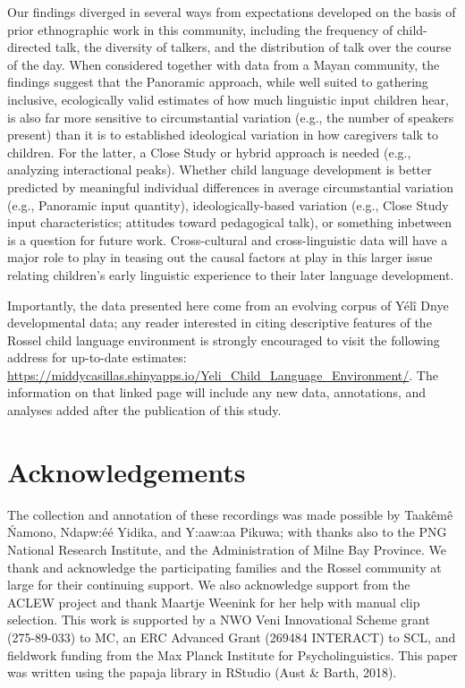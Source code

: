 \documentclass[,man,floatsintext]{apa6}
\begin{document}
Our findings diverged in several ways from expectations developed on the
basis of prior ethnographic work in this community, including the
frequency of child-directed talk, the diversity of talkers, and the
distribution of talk over the course of the day. When considered
together with data from a Mayan community, the findings suggest that the
Panoramic approach, while well suited to gathering inclusive,
ecologically valid estimates of how much linguistic input children hear,
is also far more sensitive to circumstantial variation (e.g., the number
of speakers present) than it is to established ideological variation in
how caregivers talk to children. For the latter, a Close Study or hybrid
approach is needed (e.g., analyzing interactional peaks). Whether child
language development is better predicted by meaningful individual
differences in average circumstantial variation (e.g., Panoramic input
quantity), ideologically-based variation (e.g., Close Study input
characteristics; attitudes toward pedagogical talk), or something
inbetween is a question for future work. Cross-cultural and
cross-linguistic data will have a major role to play in teasing out the
causal factors at play in this larger issue relating children's early
linguistic experience to their later language development.

Importantly, the data presented here come from an evolving corpus of
Yélî Dnye developmental data; any reader interested in citing
descriptive features of the Rossel child language environment is
strongly encouraged to visit the following address for up-to-date
estimates:
\url{https://middycasillas.shinyapps.io/Yeli_Child_Language_Environment/}.
The information on that linked page will include any new data,
annotations, and analyses added after the publication of this study.

\section{Acknowledgements}\label{acknowledgements}

The collection and annotation of these recordings was made possible by
Taakêmê Ńamono, Ndapw:éé Yidika, and Y:aaw:aa Pikuwa; with thanks also
to the PNG National Research Institute, and the Administration of Milne
Bay Province. We thank and acknowledge the participating families and
the Rossel community at large for their continuing support. We also
acknowledge support from the ACLEW project and thank Maartje Weenink for
her help with manual clip selection. This work is supported by a NWO
Veni Innovational Scheme grant (275-89-033) to MC, an ERC Advanced Grant
(269484 INTERACT) to SCL, and fieldwork funding from the Max Planck
Institute for Psycholinguistics. This paper was written using the papaja
library in RStudio (Aust \& Barth, 2018).
\end{document}
